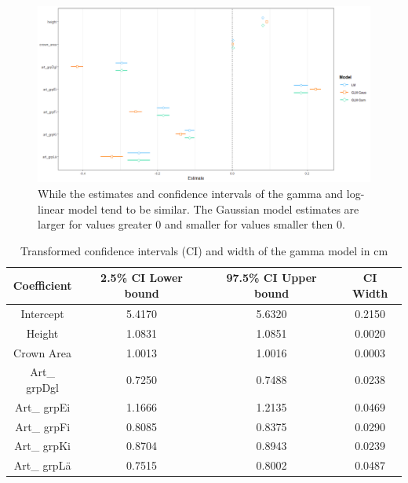 \begin{figure}[H]
  \includegraphics[width=\textwidth]{figures/coefficients.png}
  \caption{While the estimates and confidence intervals of the gamma and log-linear model tend to be similar. The Gaussian model estimates are larger for values greater 0 and smaller for values smaller then 0.}
  \label{fig:Coefficients}
\end{figure}


\begin{table}[H]
\setlength\arrayrulewidth{1pt}
\centering
\begin{adjustbox}{max width=\textwidth}
\begin{tabular}{|c| c| c| c|}
\hline 
\rowcolor{Gray}
\textbf{Coefficient} & \textbf{2.5\% CI Lower bound} & \textbf{97.5\% CI Upper bound} & \textbf{CI Width} \\
\hline
Intercept & 5.4170 & 5.6320 & 0.2150 \\ 
\hline 
Height & 1.0831 & 1.0851 & 0.0020 \\ 
\hline 
Crown Area & 1.0013 & 1.0016 & 0.0003 \\ 
\hline 
Art\_ grpDgl & 0.7250 & 0.7488 & 0.0238 \\ 
\hline 
Art\_ grpEi & 1.1666 & 1.2135 & 0.0469 \\ 
\hline 
Art\_ grpFi & 0.8085 & 0.8375 & 0.0290 \\ 
\hline 
Art\_ grpKi & 0.8704 & 0.8943 & 0.0239 \\ 
\hline 
Art\_ grpLä & 0.7515 & 0.8002 & 0.0487 \\ 
\hline 
\end{tabular} 
\end{adjustbox}

\caption{Transformed confidence intervals (CI) and width of the gamma model in cm}
\label{tab:CI}


\end{table}

